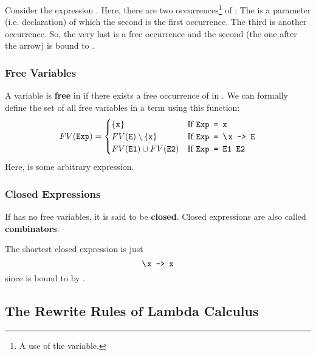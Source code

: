 \documentclass[letterpaper]{article}
\begin{document}
Consider the expression . Here, there are two occurrences\footnote{A use of the variable.} of ; The  is a parameter (i.e. declaration) of which the second  is the first occurrence. The third  is another occurrence. So, the very last  is a free occurrence and the second  (the one after the arrow) is bound to . 

\subsubsection{Free Variables}
A variable  is \textbf{free} in  if there exists a free occurrence of  in . We can formally define the set of all free variables in a term using this function: 
\[FV(\code{Exp}) = \begin{cases}
    \{\code{x}\} & \text{If } \code{Exp = x} \\ 
    FV(\code{E}) \setminus \{\code{x}\} & \text{If } \code{Exp = \bsttt{x} -> E} \\ 
    FV(\code{E1}) \cup FV(\code{E2}) & \text{If } \code{Exp = E1 E2} 
\end{cases}\]
Here,  is some arbitrary expression. 


\subsubsection{Closed Expressions}
If  has no free variables, it is said to be \textbf{closed}. Closed expressions are also called \textbf{combinators}. 

\bigskip 

The shortest closed expression is just 
\[\code{\bsttt{x} -> x}\]
since  is bound to by . 



\subsection{The Rewrite Rules of Lambda Calculus}
\end{document}
